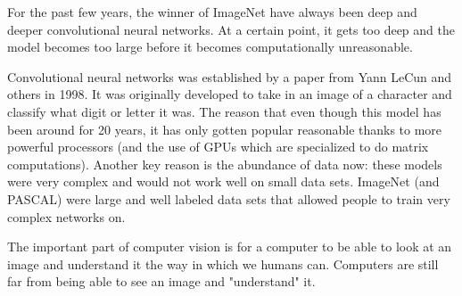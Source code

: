 \documentclass[11pt]{article}
\begin{document}
\vspace{3mm}
For the past few years, the winner of ImageNet have always been deep and deeper convolutional neural networks. At a certain point, it gets too deep and the model becomes too large before it becomes computationally unreasonable.

\vspace{3mm}
Convolutional neural networks was established by a paper from Yann LeCun and others in 1998. It was originally developed to take in an image of a character and classify what digit or letter it was. The reason that even though this model has been around for 20 years, it has only gotten popular reasonable thanks to more powerful processors (and the use of GPUs which are specialized to do matrix computations). Another key reason is the abundance of data now: these models were very complex and would not work well on small data sets. ImageNet (and PASCAL) were large and well labeled data sets that allowed people to train very complex networks on.

\vspace{3mm}
The important part of computer vision is for a computer to be able to look at an image and understand it the way in which we humans can. Computers are still far from being able to see an image and "understand" it. 
\end{document}
